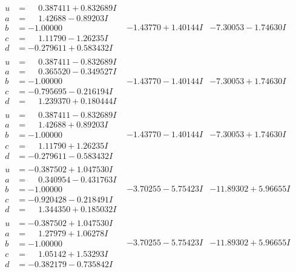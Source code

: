 \documentclass[1p]{elsarticle_modified}
\theoremstyle{definition}
\begin{document}
$$\begin{array}{c|c|c}
\begin{aligned}
u &= \phantom{-}0.387411 + 0.832689 I \\
a &= \phantom{-}1.42688 - 0.89203 I \\
b &= -1.00000\phantom{ +0.000000I} \\
c &= \phantom{-}1.11790 - 1.26235 I \\
d &= -0.279611 + 0.583432 I\end{aligned}
 & -1.43770 + 1.40144 I & -7.30053 - 1.74630 I \\ \hline\begin{aligned}
u &= \phantom{-}0.387411 - 0.832689 I \\
a &= \phantom{-}0.365520 - 0.349527 I \\
b &= -1.00000\phantom{ +0.000000I} \\
c &= -0.795695 - 0.216194 I \\
d &= \phantom{-}1.239370 + 0.180444 I\end{aligned}
 & -1.43770 - 1.40144 I & -7.30053 + 1.74630 I \\ \hline\begin{aligned}
u &= \phantom{-}0.387411 - 0.832689 I \\
a &= \phantom{-}1.42688 + 0.89203 I \\
b &= -1.00000\phantom{ +0.000000I} \\
c &= \phantom{-}1.11790 + 1.26235 I \\
d &= -0.279611 - 0.583432 I\end{aligned}
 & -1.43770 - 1.40144 I & -7.30053 + 1.74630 I \\ \hline\begin{aligned}
u &= -0.387502 + 1.047530 I \\
a &= \phantom{-}0.340954 - 0.431763 I \\
b &= -1.00000\phantom{ +0.000000I} \\
c &= -0.920428 - 0.218491 I \\
d &= \phantom{-}1.344350 + 0.185032 I\end{aligned}
 & -3.70255 - 5.75423 I & -11.89302 + 5.96655 I \\ \hline\begin{aligned}
u &= -0.387502 + 1.047530 I \\
a &= \phantom{-}1.27979 + 1.06278 I \\
b &= -1.00000\phantom{ +0.000000I} \\
c &= \phantom{-}1.05142 + 1.53293 I \\
d &= -0.382179 - 0.735842 I\end{aligned}
 & -3.70255 - 5.75423 I & -11.89302 + 5.96655 I\\

\end{array}$$
\end{document}
